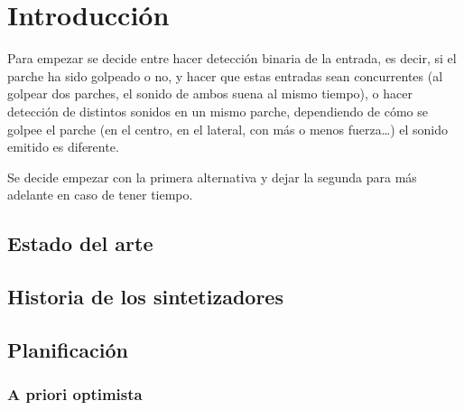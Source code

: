 
\chapter{Introducción} %
\label{cha:Introduccion}

    Para empezar se decide entre hacer detección binaria de la entrada, es decir, si el parche ha sido golpeado o no, y
    hacer que estas entradas sean concurrentes (al golpear dos parches, el sonido de ambos suena al mismo tiempo), o
    hacer detección de distintos sonidos en un mismo parche, dependiendo de cómo se golpee el parche (en el centro, en
    el lateral, con más o menos fuerza…) el sonido emitido es diferente.\newline

    Se decide empezar con la primera alternativa y dejar la segunda para más adelante en caso de tener tiempo.

    \section{Estado del arte} %
    \label{sec:EstadoDelArte}



    \section{Historia de los sintetizadores} %
    \label{sec:HistoriaDeLosSintetizadores}



    \section{Planificación} %
    \label{sec:Planificacion}

        \subsection{A priori optimista} %
        \label{sub:APrioriOptimista}

